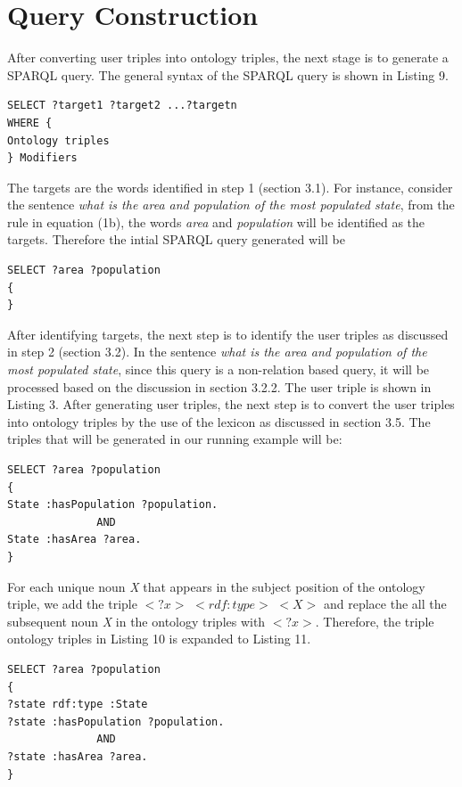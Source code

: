 \documentclass[review]{elsarticle}
\begin{document}
\section{Query Construction}
After converting user triples into   ontology triples, the next stage is to generate a SPARQL query. The general syntax of the SPARQL query is shown in Listing 9.
\begin{lstlisting}[caption= SPARQL query structure]
SELECT ?target1 ?target2 ...?targetn
WHERE {
Ontology triples 
} Modifiers
\end{lstlisting}
The targets are the words identified in step 1 (section 3.1). For instance, consider the sentence \textit{what is the area and population of the most populated state}, from the rule in equation (1b), the words \textit{area} and \textit{population} will be identified as the targets.
Therefore the intial SPARQL query generated will be
\begin{lstlisting}
SELECT ?area ?population
{
}
\end{lstlisting}
After identifying targets, the next step is to identify the user triples as discussed in step 2 (section 3.2). In the sentence  \textit{what is the area and population of the most populated state}, since this query is a non-relation based query, it will be processed based on the discussion in section 3.2.2. The user triple is shown in Listing 3.  After generating user triples, the next step is to convert the user triples into ontology triples by the use of the lexicon as discussed in section 3.5.  The triples that will be generated in our running example will be:
\begin{lstlisting}[caption= SPARQL construction]
SELECT ?area ?population
{
State :hasPopulation ?population.
              AND
State :hasArea ?area.
} 
\end{lstlisting}
For each unique noun \textit{X} that appears in the subject position of the ontology  triple, we add the triple $<?x>$ $<rdf:type>$ $<X>$ and replace the all the  subsequent noun  \textit{X}  in the ontology triples with $<?x>$. Therefore, the triple ontology triples in Listing 10 is expanded to Listing 11.
\begin{lstlisting}[caption= SPARQL construction]
SELECT ?area ?population
{
?state rdf:type :State
?state :hasPopulation ?population.
              AND
?state :hasArea ?area.
} 
\end{lstlisting}
\end{document}
